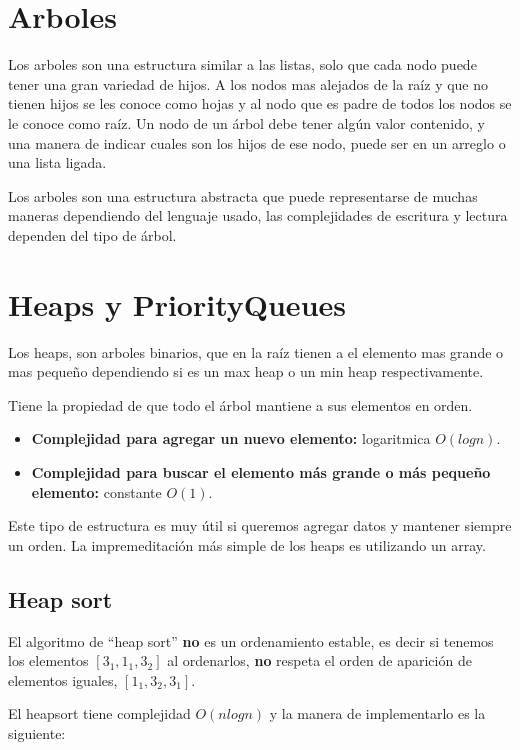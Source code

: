 \section{Arboles}

Los arboles son una estructura similar a las listas, solo que cada nodo puede tener una gran variedad de hijos. A los nodos mas alejados de la raíz y que no tienen hijos se les conoce como hojas y al nodo que es padre de todos los nodos se le conoce como raíz. Un nodo de un árbol debe tener algún valor contenido, y una manera de indicar cuales son los hijos de ese nodo, puede ser en un arreglo o una lista ligada.

Los arboles son una estructura abstracta que puede representarse de muchas maneras dependiendo del lenguaje usado, las complejidades de escritura y lectura dependen del tipo de árbol.

\section{Heaps y PriorityQueues}

Los heaps, son arboles binarios, que en la raíz tienen a el elemento mas grande o mas pequeño dependiendo si es un max heap o un min heap respectivamente.

Tiene la propiedad de que todo el árbol mantiene a sus elementos en orden.

\begin{itemize}
    \item \textbf{Complejidad para agregar un nuevo elemento:} logaritmica $O(log n)$.
    \item \textbf{Complejidad para buscar el elemento más grande o más pequeño elemento:} constante $O(1)$.
\end{itemize}

Este tipo de estructura es muy útil si queremos agregar datos y mantener siempre un orden. La impremeditación más simple de los heaps es utilizando un array. 

\subsection{Heap sort}

El algoritmo de ``heap sort'' \textbf{no} es un ordenamiento estable, es decir si tenemos los elementos $[3_1, 1_1,3_2]$ al ordenarlos, \textbf{no} respeta el orden de aparición de elementos iguales, $[1_1,3_2,3_1]$.

El heapsort tiene complejidad $O(n log n)$ y la manera de implementarlo es la siguiente:

